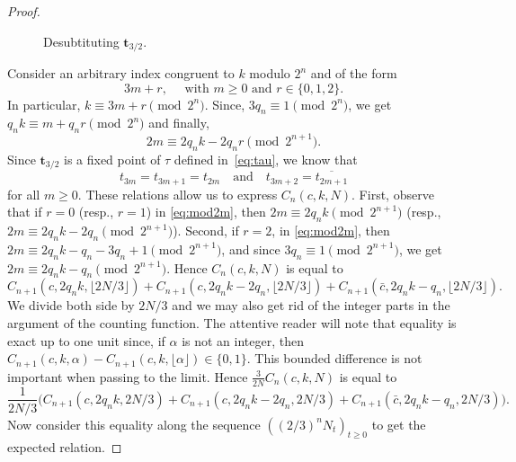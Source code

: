 \documentclass[12pt,reqno]{article}
\begin{document}
\begin{proof}
\begin{figure}
      \caption{Desubtituting $\mathbf{t}_{3/2}$.}\label{fig:desub}
    \end{figure}
%
    Consider an arbitrary index congruent to $k$ modulo $2^n$ and of the form
    \[
      3m+r,\quad \text{ with } m\ge 0 \text{ and } r\in\{0,1,2\}.
    \]
    In particular, $k\equiv 3m+r\pmod{2^n}$. Since, $3q_n\equiv 1\pmod{2^n}$, we get $q_nk\equiv m+q_nr\pmod{2^n}$ and finally,
    \begin{equation}\label{eq:mod2m}
       2m \equiv 2q_nk-2q_nr\pmod{2^{n+1}}.
    \end{equation}
    Since $\mathbf{t}_{3/2}$ is a fixed point of $\tau$ defined in~\cref{eq:tau}, we know that 
    \[
    t_{3m}=t_{3m+1}=t_{2m} \quad \text{and} \quad t_{3m+2}=\overline{t_{2m+1}}
    \]
     for all $m\ge 0$. These relations allow us to express $C_n(c,k,N)$.  First,  observe that if $r=0$ (resp.,   $r=1$) in \eqref{eq:mod2m}, then $2m\equiv 2q_nk\pmod{2^{n+1}}$ (resp.,   $2m\equiv 2q_nk-2q_n\pmod{2^{n+1}}$).  Second,  if $r=2$, in \eqref{eq:mod2m}, then $2m\equiv 2q_nk-q_n-3q_n+1 \pmod{2^{n+1}}$, and since $3q_n\equiv 1\pmod{2^{n+1}}$,  we get $2m\equiv 2q_nk-q_n\pmod{2^{n+1}}$.
Hence $C_n(c,k,N)$ is equal to 
    \[
        C_{n+1}(c,2q_nk,\lfloor 2N/3\rfloor) + C_{n+1}(c,2q_nk-2q_n,\lfloor 2N/3\rfloor)  + C_{n+1}(\bar{c},2q_nk-q_n,\lfloor 2N/3\rfloor). \]
      We divide both side by $2N/3$ and we may also get rid of the
      integer parts in the argument of the counting function. The
      attentive reader will note that equality is exact up to one
      unit since,  if $\alpha$ is not an integer, then $C_{n+1}(c,k,\alpha)-C_{n+1}(c,k,\lfloor \alpha\rfloor)\in\{0,1\}$. This bounded difference is not important when passing to the limit.  Hence
      $\frac{3}{2N} C_n(c,k,N)$ is equal to
    \[
       \frac{1}{2N/3}\biggl( C_{n+1}(c,2q_nk,2N/3) + C_{n+1}(c,2q_nk-2q_n, 2N/3)  + C_{n+1}(\bar{c},2q_nk-q_n, 2N/3)
       \biggr). \]
     Now consider this equality along the sequence $((2/3)^n N_t)_{t\ge 0}$ to get the expected relation.
      

\end{proof}
\end{document}
